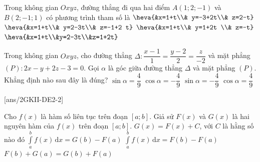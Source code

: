 \begin{ex}%
	Trong không gian $Oxyz$, đường thẳng đi qua hai điểm $A(1; 2;-1)$ và $B(2;-1; 1)$ có phương trình tham số là
	\choice
	{$\heva{&x=1+t\\& y=-3+2t\\& z=2-t}$}
	{\True $\heva{&x=1+t\\& y=2-3t\\& z=-1+2 t}$}
	{$\heva{&x=1+t\\& y=1+2t \\& z=-t}$}
	{$\heva{&x=1+t\\&y=2-3t\\&z=1+2t}$}
\end{ex}


\begin{ex}%
	Trong không gian $Oxyz$, cho đường thẳng $\Delta\colon\dfrac{x-1}{1}=\dfrac{y-2}{2}=\dfrac{z}{-2}$ và mặt phẳng $(P)\colon 2x-y+2z-3=0 $. Gọi $\alpha $ là góc giữa đường thẳng $\Delta $ và mặt phẳng $(P)$. Khẳng định nào sau đây là đúng?
	\choice
	{\True $\sin\alpha=\dfrac{4}{9}$}
	{$\cos\alpha=-\dfrac{4}{9}$}
	{$\sin\alpha=-\dfrac{4}{9}$}
	{$\cos\alpha=\dfrac{4}{9}$}
\end{ex}


\cauds
{}[ans/2GKII-DE2-2]

\begin{ex}%
	Cho $f(x)$ là hàm số liên tục trên đoạn $[a ; b]$. Giả sử $F(x)$ và $G(x)$ là hai nguyên hàm của $f(x)$ trên đoạn $[a ; b]$.
	\choiceTF
	{\True $G(x)=F(x)+C$, với $C$ là hằng số nào đó}
	{$\displaystyle\int\limits_{a}^{b} f(x)\mathrm{\,d}x=G(b)-F(a)$}
	{\True $\displaystyle\int\limits_{a}^{b} f(x)\mathrm{\,d}x=F(b)-F(a)$}
	{\True $F(b)+G(a)=G(b)+F(a)$}
\end{ex}

